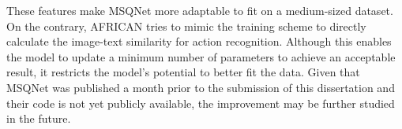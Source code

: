These features make MSQNet more adaptable to fit on a medium-sized dataset. On the contrary, AFRICAN tries to mimic the training scheme to directly calculate the image-text similarity for action recognition. Although this enables the model to update a minimum number of parameters to achieve an acceptable result, it restricts the model's potential to better fit the data. Given that MSQNet was published a month prior to the submission of this dissertation and their code is not yet publicly available, the improvement may be further studied in the future.



